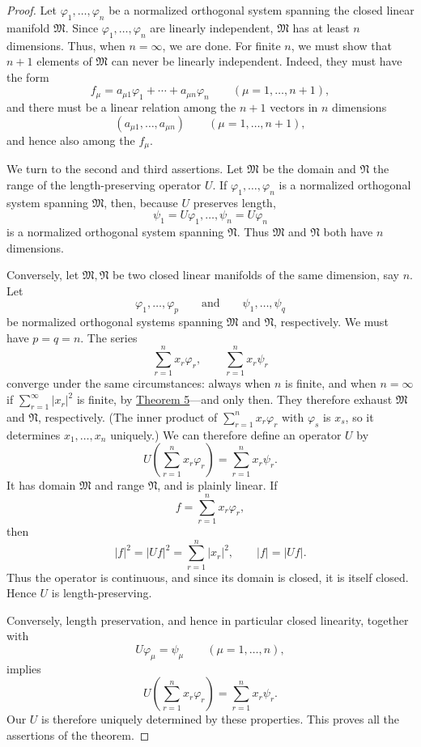 ﻿\documentclass[paper=b5,fontsize=13pt,bookmarkpackage=false,twoside]{scrartcl}
\begin{document}
\begin{proof}
Let $\varphi_1,\ldots,\varphi_n$ be a normalized orthogonal system spanning the closed linear manifold $\mathfrak M$. Since $\varphi_1,\ldots,\varphi_n$ are linearly independent, $\mathfrak M$ has at least $n$ dimensions. Thus, when $n=\infty$, we are done. For finite $n$, we must show that $n+1$ elements of $\mathfrak M$ can never be linearly independent. Indeed, they must have the form
\[
f_\mu=a_{\mu1}\varphi_1+\cdots+a_{\mu n}\varphi_n
\qquad(\mu=1,\ldots,n+1),
\]
and there must be a linear relation among the $n+1$ vectors in $n$ dimensions
\[
(a_{\mu1},\ldots,a_{\mu n})
\qquad(\mu=1,\ldots,n+1),
\]
and hence also among the $f_\mu$.

We turn to the second and third assertions. Let $\mathfrak M$ be the domain and $\mathfrak N$ the range of the length-preserving operator $U$. If $\varphi_1,\ldots,\varphi_n$ is a normalized orthogonal system spanning $\mathfrak M$, then, because $U$ preserves length,
\[
\psi_1=U\varphi_1,\ldots,\psi_n=U\varphi_n
\]
is a normalized orthogonal system spanning $\mathfrak N$. Thus $\mathfrak M$ and $\mathfrak N$ both have $n$ dimensions.

Conversely, let $\mathfrak M,\mathfrak N$ be two closed linear manifolds of the same dimension, say $n$. Let
\[
\varphi_1,\ldots,\varphi_p
\qquad\text{and}\qquad
\psi_1,\ldots,\psi_q
\]
be normalized orthogonal systems spanning $\mathfrak M$ and $\mathfrak N$, respectively. We must have $p=q=n$. The series
\[
\sum_{r=1}^{n}x_r\varphi_r,\qquad
\sum_{r=1}^{n}x_r\psi_r
\]
converge under the same circumstances: always when $n$ is finite, and when $n=\infty$ if $\sum_{r=1}^{\infty}|x_r|^2$ is finite, by \hyperref[thm:5]{Theorem 5}---and only then. They therefore exhaust $\mathfrak M$ and $\mathfrak N$, respectively. (The inner product of $\sum_{r=1}^{n}x_r\varphi_r$ with $\varphi_s$ is $x_s$, so it determines $x_1,\ldots,x_n$ uniquely.) We can therefore define an operator $U$ by
\[
U\left(\sum_{r=1}^{n}x_r\varphi_r\right)
 =\sum_{r=1}^{n}x_r\psi_r.
\]
It has domain $\mathfrak M$ and range $\mathfrak N$, and is plainly linear. If
\[
f=\sum_{r=1}^{n}x_r\varphi_r,
\]
then
\[
|f|^2=|Uf|^2=\sum_{r=1}^{n}|x_r|^2,
\qquad |f|=|Uf|.
\]
Thus the operator is continuous, and since its domain is closed, it is itself closed. Hence $U$ is length-preserving.

Conversely, length preservation, and hence in particular closed linearity, together with
\[
U\varphi_\mu=\psi_\mu\qquad(\mu=1,\ldots,n),
\]
implies
\[
U\left(\sum_{r=1}^{n}x_r\varphi_r\right)
=\sum_{r=1}^{n}x_r\psi_r.
\]
Our $U$ is therefore uniquely determined by these properties. This proves all the assertions of the theorem.
\end{proof}
\end{document}
